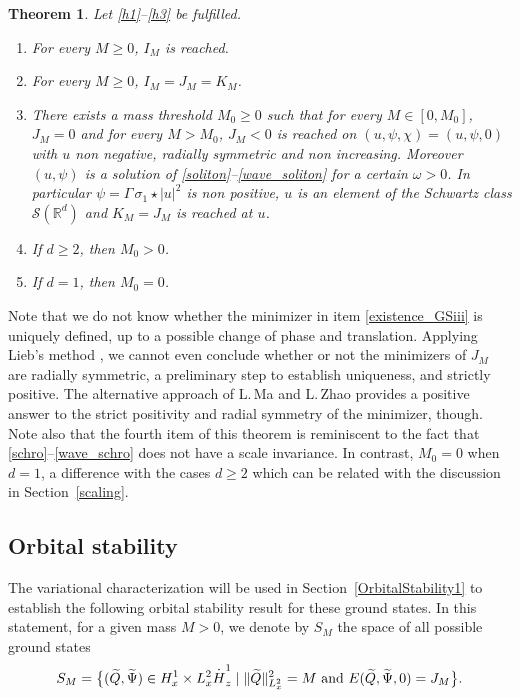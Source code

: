 \documentclass[11pt]{article}
\newenvironment{enumeratei}
{\bgroup\def\theenumi{\roman{enumi}}\def\theenumii{\arabic{enumii}}\begin{enumerate}}
{\end{enumerate}\egroup}
\DeclareRobustCommand{\accentset}[2]{\overset{#1}{#2}}
\newtheorem{theo}[lemma]{Theorem}
\theoremstyle{definition}
\newcommand*{\overbigdot}[1]{%
\accentset{\mbox{\large\bfseries .}}{#1}}
\newcommand{\R}{\mathbb{R}}
\begin{document}
\begin{theo}\label{existence_GS}
Let \eqref{h1}--\eqref{h3} be fulfilled.
\begin{enumeratei}
\item\label{existence_GSi} For every $M\geq 0$, $I_{M}$ is reached.
\item\label{existence_GSii}
For every $M\geq 0$, $I_{M}=J_{M}=K_{M}$.
\item\label{existence_GSiii}
There exists a mass threshold $M_{0}\geq 0$ such that for every $M\in[0,M_{0}]$, $J_{M}=0$ and for every $M>M_{0}$, $J_{M}<0$ is reached on $(u,\psi,\chi)=(u,\psi,0)$ with $u$ non negative, radially symmetric and non increasing. Moreover $(u,\psi)$ is a solution of \eqref{soliton}--\eqref{wave_soliton} for a certain $\omega>0$. In particular $\psi=\Gamma\,\sigma_{1}\star|u|^{2}$ is non positive, $u$ is an element of the Schwartz class $\mathcal{S}(\R^{d})$ and $K_{M}=J_{M}$ is reached at $u$.
\item\label{existence_GSiv}
If $d\geq 2$, then $M_{0}>0$.
\item\label{existence_GSv}
If $d=1$, then $M_{0}=0$.
\end{enumeratei}
\end{theo}

Note that we do not know whether the minimizer in item \eqref{existence_GSiii} is uniquely defined, up to a possible change of phase and translation.
Applying Lieb's method \cite{Lieb_Choquard}, we cannot even conclude whether or not the minimizers of $J_{M}$ are
radially symmetric, a preliminary step
to establish uniqueness, and strictly positive.
The alternative approach of L.\,Ma and L.\,Zhao \cite[\S 5]{MaZ} provides a positive answer to the strict positivity and radial symmetry of the minimizer, though.
Note also that the fourth item of this theorem is reminiscent to the fact that \eqref{schro}--\eqref{wave_schro} does not have a scale invariance. In contrast,
$M_{0}=0$ when $d=1$, a difference with the cases $d\geq 2$ which can be related with the discussion in Section~\ref{scaling}.

\subsection{Orbital stability}

The variational characterization will be used in Section~\ref{OrbitalStability1} to establish the following orbital stability result for these ground states. In this statement, for a given mass $M>0$, we denote by $S_{M}$ the space of all possible ground states
\[
S_{M}=\bigl\{(\widetilde{Q},\widetilde{\Psi})\in H_{x}^{1}\times L_{x}^{2}\overbigdot{H}_{z}^{1}\mid\|\widetilde{Q}\|_{L_{x}^{2}}^{2}=M\text{ and }E(\widetilde{Q},\widetilde{\Psi},0)=J_{M}\bigr\}.
\]
\end{document}
